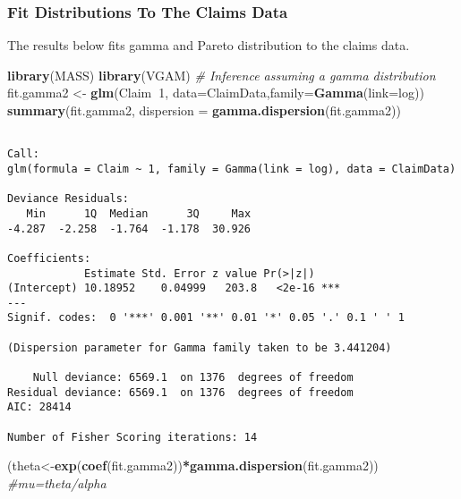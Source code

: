 \documentclass[]{book}
\newenvironment{Shaded}{\begin{snugshade}}{\end{snugshade}}
\newcommand{\KeywordTok}[1]{\textcolor[rgb]{0.13,0.29,0.53}{\textbf{#1}}}
\newcommand{\DataTypeTok}[1]{\textcolor[rgb]{0.13,0.29,0.53}{#1}}
\newcommand{\DecValTok}[1]{\textcolor[rgb]{0.00,0.00,0.81}{#1}}
\newcommand{\StringTok}[1]{\textcolor[rgb]{0.31,0.60,0.02}{#1}}
\newcommand{\CommentTok}[1]{\textcolor[rgb]{0.56,0.35,0.01}{\textit{#1}}}
\newcommand{\OperatorTok}[1]{\textcolor[rgb]{0.81,0.36,0.00}{\textbf{#1}}}
\newcommand{\NormalTok}[1]{#1}
\theoremstyle{definition}
\theoremstyle{definition}
\theoremstyle{definition}
\theoremstyle{remark}
\begin{document}
\subsubsection{Fit Distributions To The Claims
Data}\label{fit-distributions-to-the-claims-data}

The results below fits gamma and Pareto distribution to the claims data.

\begin{Shaded}
\begin{Highlighting}[]
\KeywordTok{library}\NormalTok{(MASS)}
\KeywordTok{library}\NormalTok{(VGAM)}
\CommentTok{# Inference assuming a gamma distribution}
\NormalTok{fit.gamma2 <-}\StringTok{ }\KeywordTok{glm}\NormalTok{(Claim}\OperatorTok{~}\DecValTok{1}\NormalTok{, }\DataTypeTok{data=}\NormalTok{ClaimData,}\DataTypeTok{family=}\KeywordTok{Gamma}\NormalTok{(}\DataTypeTok{link=}\NormalTok{log)) }
\KeywordTok{summary}\NormalTok{(fit.gamma2, }\DataTypeTok{dispersion =} \KeywordTok{gamma.dispersion}\NormalTok{(fit.gamma2)) }
\end{Highlighting}
\end{Shaded}

\begin{verbatim}

Call:
glm(formula = Claim ~ 1, family = Gamma(link = log), data = ClaimData)

Deviance Residuals: 
   Min      1Q  Median      3Q     Max  
-4.287  -2.258  -1.764  -1.178  30.926  

Coefficients:
            Estimate Std. Error z value Pr(>|z|)    
(Intercept) 10.18952    0.04999   203.8   <2e-16 ***
---
Signif. codes:  0 '***' 0.001 '**' 0.01 '*' 0.05 '.' 0.1 ' ' 1

(Dispersion parameter for Gamma family taken to be 3.441204)

    Null deviance: 6569.1  on 1376  degrees of freedom
Residual deviance: 6569.1  on 1376  degrees of freedom
AIC: 28414

Number of Fisher Scoring iterations: 14
\end{verbatim}

\begin{Shaded}
\begin{Highlighting}[]
\NormalTok{(theta<-}\KeywordTok{exp}\NormalTok{(}\KeywordTok{coef}\NormalTok{(fit.gamma2))}\OperatorTok{*}\KeywordTok{gamma.dispersion}\NormalTok{(fit.gamma2)) }\CommentTok{#mu=theta/alpha}
\end{Highlighting}
\end{Shaded}
\end{document}
